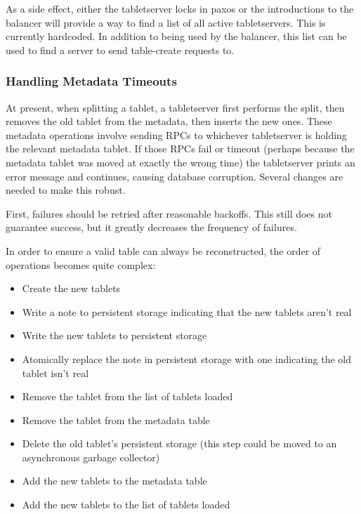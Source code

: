 \documentclass[11pt]{article}
\begin{document}
As a side effect, either the tabletserver locks in paxos or the introductions to the balancer will provide a way to find a list of all active tabletservers.  This is currently hardcoded.  In addition to being used by the balancer, this list can be used to find a server to send table-create requests to.

\subsubsection{Handling Metadata Timeouts}

At present, when splitting a tablet, a tabletserver first performs the split, then removes the old tablet from the metadata, then inserts the new ones.  These metadata operations involve sending RPCs to whichever tabletserver is holding the relevant metadata tablet.  If those RPCs fail or timeout (perhaps because the metadata tablet was moved at exactly the wrong time) the tabletserver prints an error message and continues, causing database corruption.  Several changes are needed to make this robust.

First, failures should be retried after reasonable backoffs.  This still does not guarantee success, but it greatly decreases the frequency of failures.

In order to ensure a valid table can always be reconstructed, the order of operations becomes quite complex:

\begin{itemize}
\setlength\itemsep{0em}
\item Create the new tablets
\item Write a note to persistent storage indicating that the new tablets aren't real
\item Write the new tablets to persistent storage
\item Atomically replace the note in persistent storage with one indicating the old tablet isn't real
\item Remove the tablet from the list of tablets loaded
\item Remove the tablet from the metadata table
\item Delete the old tablet's persistent storage (this step could be moved to an asynchronous garbage collector)
\item Add the new tablets to the metadata table
\item Add the new tablets to the list of tablets loaded
\end{itemize}
\end{document}
